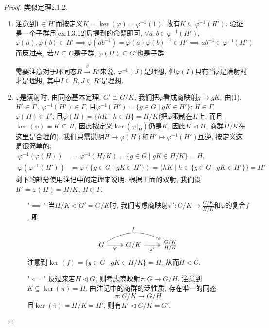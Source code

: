 \begin{proof}
    类似定理2.1.2.

    \begin{enumerate}[(1)]
        \item 注意到$1 \in H'$而按定义$K = \ker(\varphi) = \varphi^{-1}(1)$. 故有$K \subseteq \varphi^{-1}(H')$. 验证是一个子群用\ref{ex:1.3.12}后提到的命题即可, $\forall a, b \in \varphi^{-1}(H'),$
        \[
            \varphi(a), \varphi(b) \in H' \implies \varphi(ab^{-1}) = \varphi(a)\varphi(b)^{-1} \in H' \implies ab^{-1} \in \varphi^{-1}(H')
        \]
        而反过来, 若$H \subseteq G$是子群, $\varphi(H) \subseteq G'$也是子群.

        \begin{remark}
            需要注意对于环同态$R \xrightarrow{\varphi} R'$来说, $\varphi^{-1}(J)$是理想, 但$\varphi(I)$只有当$\varphi$是满射时才是理想, 其中$I \subseteq R, J \subseteq R'$是理想.
        \end{remark}
        \item $\varphi$是满射时, 由同态基本定理, $G' \cong G/K$, 我们把$\varphi$看成商映射$g \mapsto gK$. 由(1), $H' \in \Gamma'$, $\varphi^{-1}(H') \in \Gamma$, 且$\varphi^{-1}(H') = \{g \in G \mid gK \in H'\}$; $H \in \Gamma$, $\varphi(H) \in \Gamma'$, 且$\varphi(H) = \{hK \mid h \in H\} = H/K$(把$\varphi$限制在$H$上, 而且$\ker(\varphi) = K \subseteq H$, 因此按定义$\ker(\varphi|_H)$仍是$K$, 因此$K \lhd H$, 商群$H/K$在这里是合理的). 我们只需说明$H \mapsto \varphi(H)$和$H' \mapsto \varphi^{-1}(H')$互逆, 按定义这是很简单的:
        \[
        \begin{aligned}
            \varphi^{-1}(\varphi(H)) &= \varphi^{-1}(H/K) = \{g \in G \mid gK \in H/K\} = H,\\
            \varphi(\varphi^{-1}(H')) &= \varphi(\{g \in G \mid gK \in H'\}) = \{hK \mid h \in \{g \in G \mid gK \in H'\}\} = H'
        \end{aligned}
        \]
        剩下的部分使用注记中的定理来说明. 根据上面的双射, 我们设$H' = \varphi(H) = H/K$, $H \in \Gamma$.
        \begin{enumerate}
            \item["$\implies$"] 当$H/K \lhd G' = G/K$时, 我们考虑商映射$\pi':G/K \to \frac{G/K}{H/K}$和$\varphi$的复合$f$, 即
            \[
                \begin{tikzcd}
                    G \arrow[r, "\varphi"', two heads] \arrow[rr, "f", bend left] & G/K \arrow[r, "\pi'"', two heads] & \frac{G/K}{H/K}
                \end{tikzcd}
            \]
            注意到$\ker(f) = \{g \in G \mid gK \in H/K\} = H$, 从而$H \lhd G$.
            \item["$\impliedby$"] 反过来若$H \lhd G$, 则考虑商映射$\pi:G \to G/H$. 注意到$K \subseteq \ker(\pi) = H$, 由注记中的商群的泛性质, 存在唯一的同态
            \[
                \overline{\pi}:G/K \to G/H
            \]
            且$\ker(\overline{\pi}) = H/K = H'$, 则有$H' \lhd G/K = G'$.
        \end{enumerate}
    \end{enumerate}
\end{proof}

